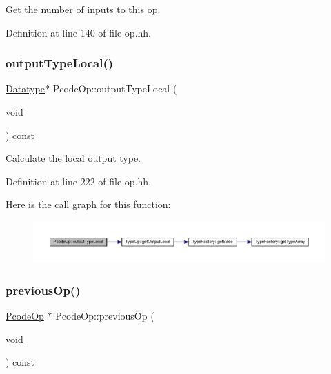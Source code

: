 Get the number of inputs to this op. 



Definition at line 140 of file op.\+hh.

\mbox{\label{class_pcode_op_ad27780592d3dac5267551aa7f02c5bb7}} 
\subsubsection{\texorpdfstring{outputTypeLocal()}{outputTypeLocal()}}
{\footnotesize\ttfamily \mbox{\hyperlink{class_datatype}{Datatype}}$\ast$ Pcode\+Op\+::output\+Type\+Local (\begin{DoxyParamCaption}\item[{void}]{ }\end{DoxyParamCaption}) const\hspace{0.3cm}{\ttfamily [inline]}}



Calculate the local output type. 



Definition at line 222 of file op.\+hh.

Here is the call graph for this function\+:
\nopagebreak
\begin{figure}[H]
\begin{center}
\leavevmode
\includegraphics[width=350pt]{class_pcode_op_ad27780592d3dac5267551aa7f02c5bb7_cgraph}
\end{center}
\end{figure}
\mbox{\label{class_pcode_op_a2d0518b850450346c635f9d04725be5e}} 
\subsubsection{\texorpdfstring{previousOp()}{previousOp()}}
{\footnotesize\ttfamily \mbox{\hyperlink{class_pcode_op}{Pcode\+Op}} $\ast$ Pcode\+Op\+::previous\+Op (\begin{DoxyParamCaption}\item[{void}]{ }\end{DoxyParamCaption}) const}



